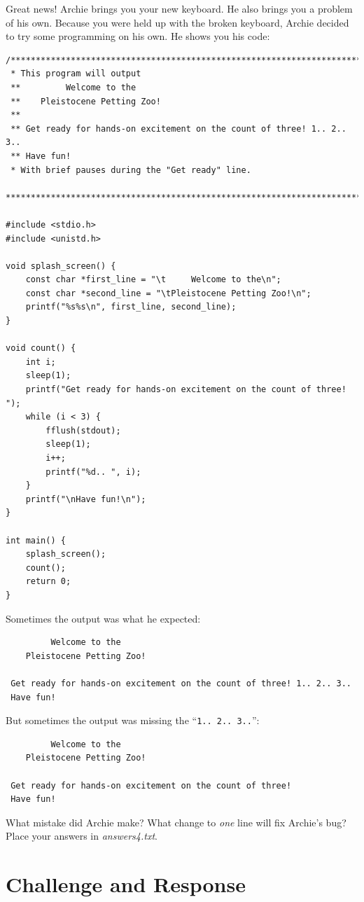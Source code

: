 Great news! Archie brings you your new keyboard. He also brings you a problem
of his own. Because you were held up with the broken keyboard, Archie decided
to try some programming on his own. He shows you his code:

\begin{lstlisting}
/***********************************************************************
 * This program will output
 **         Welcome to the
 **    Pleistocene Petting Zoo!
 **
 ** Get ready for hands-on excitement on the count of three! 1.. 2.. 3..
 ** Have fun!
 * With brief pauses during the "Get ready" line.
 ***********************************************************************/

#include <stdio.h>
#include <unistd.h>

void splash_screen() {
    const char *first_line = "\t     Welcome to the\n";
    const char *second_line = "\tPleistocene Petting Zoo!\n";
    printf("%s%s\n", first_line, second_line);
}

void count() {
    int i;
    sleep(1);
    printf("Get ready for hands-on excitement on the count of three! ");
    while (i < 3) {
        fflush(stdout);
        sleep(1);
        i++;
        printf("%d.. ", i);
    }
    printf("\nHave fun!\n");
}

int main() {
    splash_screen();
    count();
    return 0;
}
\end{lstlisting}

Sometimes the output was what he expected:
\begin{verbatim}
         Welcome to the
    Pleistocene Petting Zoo!

 Get ready for hands-on excitement on the count of three! 1.. 2.. 3..
 Have fun!
\end{verbatim}

But sometimes the output was missing the
``\texttt{1.. 2.. 3..}'':
\begin{verbatim}
         Welcome to the
    Pleistocene Petting Zoo!

 Get ready for hands-on excitement on the count of three!
 Have fun!
\end{verbatim}

What mistake did Archie make? What change to \textit{one} line will fix
Archie's bug? Place your answers in \textit{answers4.txt}.


\section{Challenge and Response}

